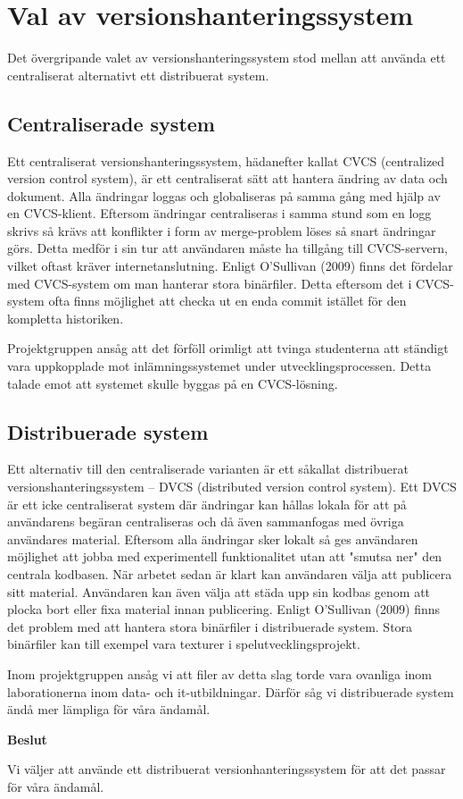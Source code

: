 \section{Val av versionshanteringssystem}

Det övergripande valet av versionshanteringssystem stod mellan att använda ett centraliserat alternativt ett distribuerat system.

\subsection{Centraliserade system}

Ett centraliserat versionshanteringssystem, hädanefter kallat CVCS (centralized version control system), är ett centraliserat sätt att hantera ändring av data och dokument. Alla ändringar loggas och globaliseras på samma gång med hjälp av en CVCS-klient. Eftersom ändringar centraliseras i samma stund som en logg skrivs så krävs att konflikter i form av merge-problem löses så snart ändringar görs. Detta medför i sin tur att användaren måste ha tillgång till CVCS-servern, vilket oftast kräver internetanslutning.
Enligt O’Sullivan (2009) finns det fördelar med CVCS-system om man hanterar stora binärfiler. Detta eftersom det i CVCS-system ofta finns möjlighet att checka ut en enda commit istället för den kompletta historiken.

Projektgruppen ansåg att det förföll orimligt att tvinga studenterna att ständigt vara uppkopplade mot inlämningssystemet under utvecklingsprocessen. Detta talade emot att systemet skulle byggas på en CVCS-lösning.

\subsection{Distribuerade system}

Ett alternativ till den centraliserade varianten är ett såkallat distribuerat versionshanteringssystem – DVCS (distributed version control system). 
Ett DVCS är ett icke centraliserat system där ändringar kan hållas lokala för att på användarens begäran centraliseras och då även sammanfogas med övriga användares material. Eftersom alla ändringar sker lokalt så ges användaren möjlighet att jobba med experimentell funktionalitet utan att "smutsa ner" den centrala kodbasen. När arbetet sedan är klart kan användaren välja att publicera sitt material. Användaren kan även välja att städa upp sin kodbas genom att  plocka bort eller fixa material innan publicering.
Enligt O’Sullivan (2009) finns det problem med att hantera stora binärfiler i distribuerade system. Stora binärfiler kan till exempel vara texturer i spelutvecklingsprojekt. 

Inom projektgruppen ansåg vi att filer av detta slag torde vara ovanliga inom laborationerna inom data- och it-utbildningar. Därför såg vi  distribuerade system ändå mer lämpliga för våra ändamål.
\begin{flushright}
  
  \textbf{Beslut}
  
  Vi väljer att använde ett distribuerat versionhanteringssystem för att det passar för våra ändamål.
  
\end{flushright}

